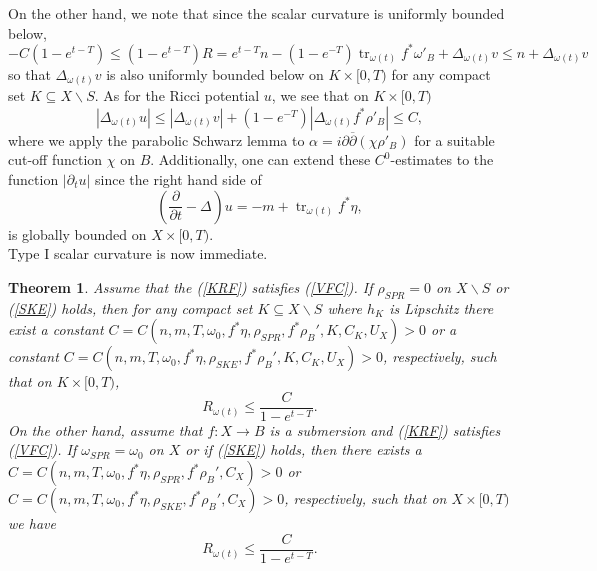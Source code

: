 \documentclass[12pt]{article}
\newtheorem{theorem}{Theorem}[section]
\numberwithin{equation}{section}
\renewcommand{\d}{\partial}
\newcommand{\dbar}{\overline{\partial}}
\DeclareMathOperator{\tr}{tr}
\newcommand{\parabolic}[1]{\left(\frac{\d}{\d t} - \Delta_{#1}\right)}
\begin{document}
\noindent On the other hand, we note that since the scalar curvature is uniformly bounded below,
\begin{equation*}
    -C(1-e^{t-T}) \leq (1-e^{t-T}) R = e^{t-T}n - (1-e^{-T})\tr_{\omega(t)} f^*\omega'_B + \Delta_{\omega(t)} v \leq n + \Delta_{\omega(t)} v
\end{equation*}
so that $\Delta_{\omega(t)} v$ is also uniformly bounded below on $K \times [0,T)$ for any compact set $K \subseteq X \backslash S$. As for the Ricci potential $u$, we see that on $K \times [0,T)$
\begin{equation*}
    |\Delta_{\omega(t)} u| \leq |\Delta_{\omega(t)} v| + (1-e^{-T})|\Delta_{\omega(t)} f^*\rho'_B| \leq C,
\end{equation*}
where we apply the parabolic Schwarz lemma to $\alpha = i\d\dbar (\chi \rho'_B)$ for a suitable cut-off function $\chi$ on $B$. Additionally, one can extend these $C^0$-estimates to the function $|\d_t u|$ since the right hand side of
\begin{equation*}
    \parabolic{}u = -m + \tr_{\omega(t)} f^*\eta,
\end{equation*}
is globally bounded on $X \times [0,T)$.\\

\noindent Type I scalar curvature is now immediate.

\begin{theorem}
Assume that the (\ref{KRF}) satisfies (\ref{VFC}). If $\rho_{SPR} = 0$ on $X \backslash S$ or (\ref{SKE}) holds, then for any compact set $K \subseteq X \backslash S$ where $h_K$ is Lipschitz there exist a constant $C = C(n,m,T,\omega_0,f^*\eta,\rho_{SPR},f^*\rho_B',K,C_K,U_X) > 0$ or a constant $C = C(n,m,T,\omega_0,f^*\eta,\rho_{SKE},f^*\rho_B',K,C_K,U_X) > 0$, respectively, such that on $K \times [0,T)$,
\begin{equation*}
    R_{\omega(t)} \leq \frac{C}{1-e^{t-T}}.
\end{equation*}
On the other hand, assume that $f:X \to B$ is a submersion and (\ref{KRF}) satisfies (\ref{VFC}). If $\omega_{SPR} = \omega_{0}$ on $X$ or if (\ref{SKE}) holds, then there exists a $C = C(n,m,T,\omega_0, f^*\eta,\rho_{SPR},f^*\rho_B',C_X) > 0$ or $C = C(n,m,T,\omega_0,f^*\eta,\rho_{SKE},f^*\rho_B',C_X) > 0$, respectively, such that on $X \times [0,T)$ we have
\begin{equation*}
    R_{\omega(t)} \leq \frac{C}{1-e^{t-T}}.
\end{equation*}
\end{theorem}
\end{document}
